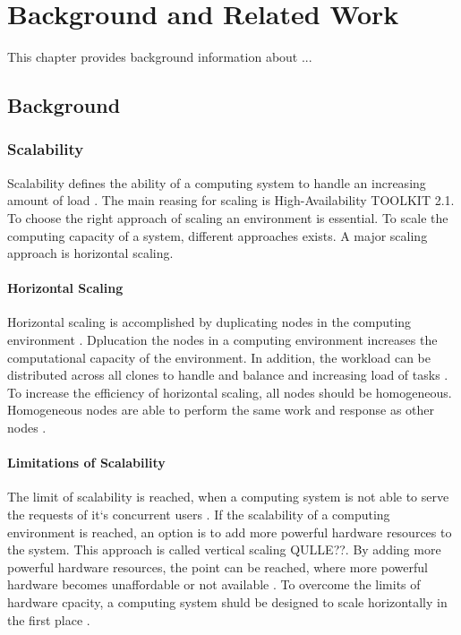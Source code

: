 \chapter{Background and Related Work}
\label{sec:related}
%

This chapter provides background information about ...

\section{Background}

\subsection{Scalability}
Scalability defines the ability of a computing system to handle an increasing amount of load \cite{Farcic2017Toolkit21}.
The main reasing for scaling is High-Availability TOOLKIT 2.1.
To choose the right approach of scaling an environment is essential.
To scale the computing capacity of a system, different approaches exists. A major scaling approach is horizontal scaling.



\subsubsection{Horizontal Scaling}
Horizontal scaling is accomplished by duplicating nodes in the computing environment \cite{Wilder2012CloudPatterns}.
Dplucation the nodes in a computing environment increases the computational capacity of the environment. In addition, the workload can be distributed across all clones to handle and balance and increasing load of tasks \cite{Wilder2012CloudPatterns, Abbott2015ScalabilityArt}. 
To increase the efficiency of horizontal scaling, all nodes should be homogeneous. Homogeneous nodes are able to perform the same work and response as other nodes \cite{Abbott2015ScalabilityArt}.


\subsubsection{Limitations of Scalability}
The limit of scalability is reached, when a computing system is not able to serve the requests of it`s concurrent users \cite{Wilder2012CloudPatterns}.
If the scalability of a computing environment is reached, an option is to add more powerful hardware resources to the system. This approach is called vertical scaling QULLE??. By adding more powerful hardware resources, the point can be reached, where more powerful hardware becomes unaffordable or not available \cite{Wilder2012CloudPatterns}.
To overcome the limits of hardware cpacity, a computing system shuld be designed to scale horizontally in the first place \cite{Abbott2015ScalabilityArt}.


